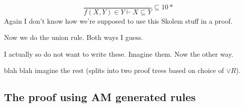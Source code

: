 \documentclass[12pt]{article}
\begin{document}
\[
    \frac{}{f(X,Y)\in Y\vdash X\subseteq Y}\subseteq 10*
\]
Again I don't know how we're supposed to use this Skolem stuff in a proof.

Now we do the union rule. Both ways I guess.
\begin{prooftree}
\end{prooftree}
I actually so do not want to write these. Imagine them. Now the other way.
\begin{prooftree}
\end{prooftree}
blah blah imagine the rest (splits into two proof trees based on choice of $\vee
R$).

\subsection{The proof using AM generated rules}
\end{document}

